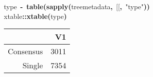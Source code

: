 \documentclass[authoryear, preprint]{elsarticle}
\makeatletter
\newcommand{\hlfunctioncall}[1]{\textcolor[rgb]{.5,0,.33}{\textbf{#1}}}%
\newcommand{\hlstring}[1]{\textcolor[rgb]{.6,.6,1}{#1}}%
\newcommand{\hlkeyword}[1]{\textbf{#1}}%
\newcommand{\hlassignement}[1]{\textbf{#1}}%
\newcommand{\hlpackage}[1]{\textcolor[rgb]{.59,.71,.145}{#1}}%
\newcommand{\hlsymbol}[1]{#1}%
\newcommand{\hlstd}[1]{\textcolor[rgb]{0,0,0}{#1}}%
\newenvironment{kframe}{%
 \def\FrameCommand##1{\hskip\@totalleftmargin \hskip-\fboxsep
 \colorbox{shadecolor}{##1}\hskip-\fboxsep
     \hskip-\linewidth \hskip-\@totalleftmargin \hskip\columnwidth}%
 \MakeFramed {\advance\hsize-\width
   \@totalleftmargin\z@ \linewidth\hsize
   \@setminipage}}%
 {\par\unskip\endMakeFramed}
\newenvironment{knitrout}{}{} %
\makeatother
\begin{document}
\begin{knitrout}
\color{fgcolor}\begin{kframe}
\begin{flushleft}
\ttfamily\noindent
\hlsymbol{type}{\ }\hlassignement{\usebox{\hlnormalsizeboxlessthan}-}{\ }\hlfunctioncall{table}\hlkeyword{(}\hlfunctioncall{sapply}\hlkeyword{(}\hlsymbol{tree\usebox{\hlnormalsizeboxunderscore}metadata}\hlkeyword{,}{\ }\hlsymbol{\usebox{\hlnormalsizeboxbacktick}[[\usebox{\hlnormalsizeboxbacktick}}\hlkeyword{,}{\ }\hlstring{"{}type"{}}\hlkeyword{)}\hlkeyword{)}\hspace*{\fill}\\
\hlstd{}\hlpackage{xtable}\hlkeyword{::}\hlfunctioncall{xtable}\hlkeyword{(}\hlsymbol{type}\hlkeyword{)}\mbox{}
\normalfont
\end{flushleft}
\end{kframe}\begin{table}[ht]
\begin{center}
\begin{tabular}{rr}
  \hline
 & V1 \\ 
  \hline
Consensus & 3011 \\ 
  Single & 7354 \\ 
   \hline
\end{tabular}
\end{center}
\end{table}\color{fgcolor}
\end{knitrout}
\end{document}
